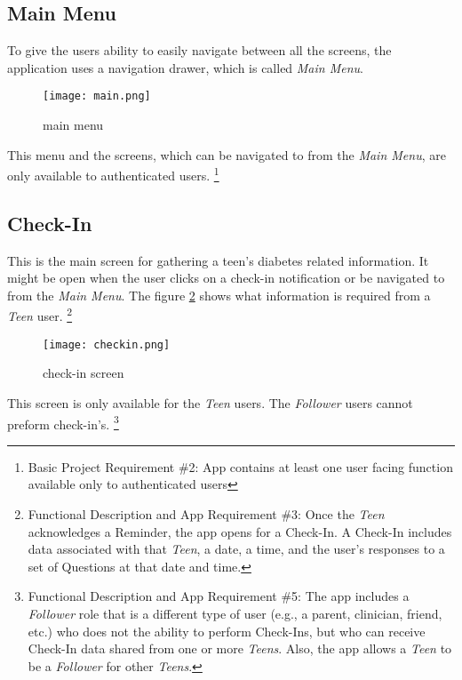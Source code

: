 \documentclass{article}
\begin{document}
\newpage

    \subsection{Main Menu}

    To give the users ability to easily navigate between all the screens, the application uses a navigation drawer, which is called \emph{Main Menu}.
    
    \begin{figure}[h]
        \centering
        \texttt{[image: main.png]}
        \caption{main menu}
        \label{fig:screen_main}
    \end{figure}


    This menu and the screens, which can be navigated to from the \emph{Main Menu}, are only available to authenticated users.
    \footnote{Basic Project Requirement \#2: App contains at least one user facing function available only to authenticated users}

\newpage

    \subsection{Check-In}

    This is the main screen for gathering a teen's diabetes related information. It might be open when the user clicks on a check-in notification or be navigated to from the \emph{Main Menu}. The figure \ref{fig:screen_checkin} shows what information is required from a \emph{Teen} user.
    \footnote{Functional Description and App Requirement \#3: Once the \emph{Teen} acknowledges a Reminder, the app opens for a Check-In.  A Check-In includes data associated with that \emph{Teen}, a date, a time, and the user's responses to a set of Questions at that date and time.}

    \begin{figure}[h]
        \centering
        \texttt{[image: checkin.png]}
        \caption{check-in screen}
        \label{fig:screen_checkin}
    \end{figure}

    This screen is only available for the \emph{Teen} users. The \emph{Follower} users cannot preform check-in's.
    \footnote{Functional Description and App Requirement \#5: The app includes a \emph{Follower} role that is a different type of user (e.g., a parent, clinician, friend, etc.) who does not the ability to perform Check-Ins, but who can receive Check-In data shared from one or more \emph{Teens}. Also, the app allows a \emph{Teen} to be a \emph{Follower} for other \emph{Teens}.}
\end{document}
